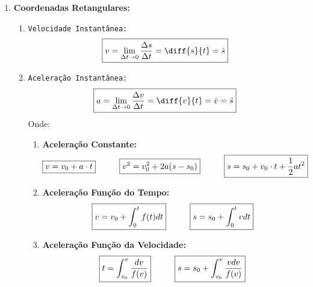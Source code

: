 \documentclass{article}
\begin{document}
                \begin{enumerate}[noitemsep]
                    \item \textbf{Coordenadas Retangulares:}
                        \begin{enumerate}[noitemsep]
                            \item \texttt{Velocidade Instantânea:}
                                \begin{equation}
                                    \boxed{
                                        v = \lim_{\Delta t \to 0} \frac{\Delta s}{\Delta t} = \diff{s}{t} =\dot{s}
                                    }
                                \end{equation}
                            \item \texttt{Aceleração Instantânea:}
                                \begin{equation}
                                    \boxed{
                                        a = \lim_{\Delta t \to 0} \frac{\Delta v}{\Delta t} = \diff{v}{t} =\dot{v} = \ddot{s}
                                    }
                                \end{equation}
                            Onde:
                                \begin{enumerate}[noitemsep]
                                    \item \textbf{Aceleração Constante:}
                                        \[
                                            \boxed{v = v_{0} + a \cdot t}
                                            \hspace{10mm}
                                            \boxed{v^{2} = v_{0}^{2} + 2 a (s - s_{0})}
                                            \hspace{10mm}
                                            \boxed{s = s_{0} + v_{0} \cdot t + \frac{1}{2} a t^{2}}
                                        \]
                                    \item \textbf{Aceleração Função do Tempo:}
                                        \[
                                            \boxed{v = v_{0} + \int_{0}^{t} f(t) dt}
                                            \hspace{10mm}
                                            \boxed{s = s_{0} + \int_{0}^{t} v dt}
                                        \]
                                    \item \textbf{Aceleração Função da Velocidade:}
                                        \[
                                            \boxed{t = \int_{v_{0}}^{v} \frac{dv}{f(v)}}
                                            \hspace{10mm}
                                            \boxed{s = s_{0} + \int_{v_{0}}^{v} \frac{v dv}{f(v)}}
                                        \]
                                \end{enumerate}
                        \end{enumerate}
                \end{enumerate}
\end{document}
